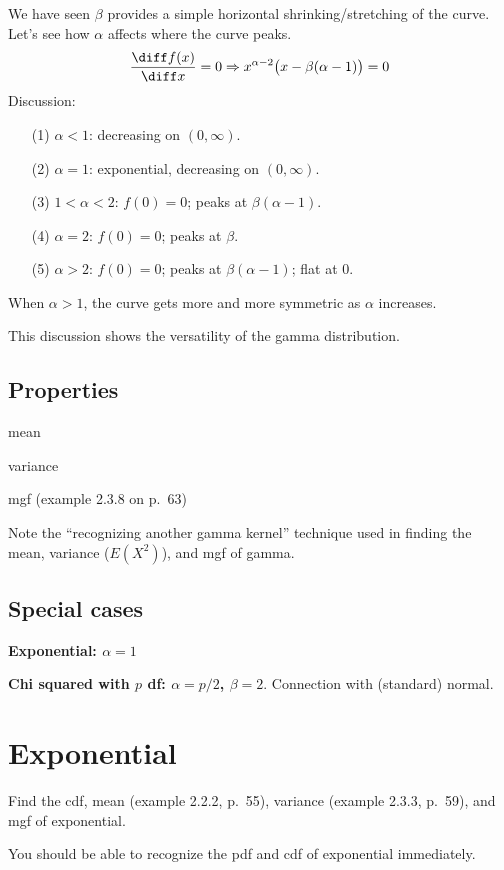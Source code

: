 \documentclass[12pt]{article}
\begin{document}
\exercise%
We have seen $\beta$ provides a simple horizontal shrinking/stretching
of the curve. Let's see how $\alpha$ affects where the curve peaks.
\[
\frac{\diff f(x)}{\diff x} = 0
\Rightarrow
x^{\alpha-2} \bigl(x - \beta(\alpha - 1)\bigr) = 0
\]
Discussion:
\begin{enumerate}
\item[(1)] $\alpha < 1$: decreasing on $(0, \infty)$.
\item[(2)] $\alpha = 1$: exponential, decreasing on $(0, \infty)$.
\item[(3)] $1 < \alpha < 2$: $f(0) = 0$; peaks at $\beta(\alpha - 1)$.
\item[(4)] $\alpha = 2$: $f(0) = 0$; peaks at $\beta$.
\item[(5)] $\alpha > 2$: $f(0) = 0$; peaks at $\beta(\alpha - 1)$; flat
at 0.
\end{enumerate}
When $\alpha > 1$, the curve gets more and more symmetric as $\alpha$
increases.

This discussion shows the versatility of the gamma distribution.

\subsection{Properties}

mean

variance

mgf (example 2.3.8 on p.~63)

Note the ``recognizing another gamma kernel'' technique used in finding
the mean, variance ($E(X^2)$), and mgf of gamma.

\subsection{Special cases}

\textbf{Exponential: $\alpha = 1$}

\textbf{Chi squared with $p$ df: $\alpha = p/2$, $\beta = 2$}.
Connection with (standard) normal.

\section{Exponential}

Find the
cdf,
mean (example 2.2.2, p.~55),
variance (example 2.3.3, p.~59),
and mgf of exponential.

You should be able to recognize the pdf and cdf of exponential
immediately.
\end{document}
